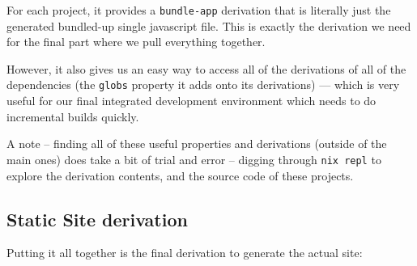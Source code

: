 \documentclass[]{article}
\begin{document}
For each project, it provides a \texttt{bundle-app} derivation that is literally
just the generated bundled-up single javascript file. This is exactly the
derivation we need for the final part where we pull everything together.

However, it also gives us an easy way to access all of the derivations of all of
the dependencies (the \texttt{globs} property it adds onto its derivations) ---
which is very useful for our final integrated development environment which
needs to do incremental builds quickly.

A note -- finding all of these useful properties and derivations (outside of the
main ones) does take a bit of trial and error -- digging through
\texttt{nix\ repl} to explore the derivation contents, and the source code of
these projects.

\subsection{Static Site derivation}\label{static-site-derivation}

Putting it all together is the final derivation to generate the actual site:
\end{document}
